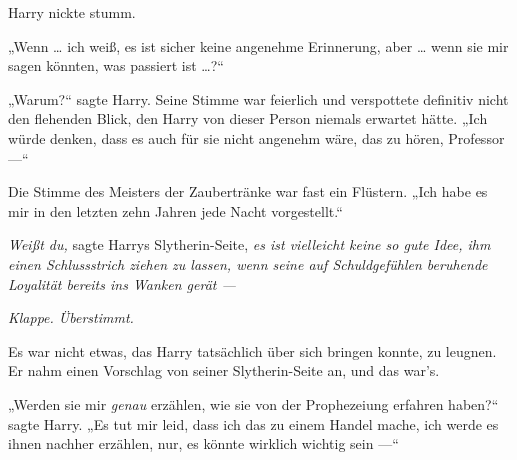 Harry nickte stumm.

„Wenn … ich weiß, es ist sicher keine angenehme Erinnerung, aber … wenn sie mir sagen könnten, was passiert ist …?“

„Warum?“ sagte Harry.
Seine Stimme war feierlich und verspottete definitiv nicht den flehenden Blick, den Harry von dieser Person niemals erwartet hätte.
„Ich würde denken, dass es auch für sie nicht angenehm wäre, das zu hören, Professor —“

Die Stimme des Meisters der Zaubertränke war fast ein Flüstern.
„Ich habe es mir in den letzten zehn Jahren jede Nacht vorgestellt.“

\emph{Weißt du,} sagte Harrys Slytherin-Seite, \emph{es ist vielleicht keine so gute Idee, ihm einen Schlussstrich ziehen zu lassen, wenn seine auf Schuldgefühlen beruhende Loyalität bereits ins Wanken gerät —}

\emph{Klappe. Überstimmt.}

Es war nicht etwas, das Harry tatsächlich über sich bringen konnte, zu leugnen. Er nahm einen Vorschlag von seiner Slytherin-Seite an, und das war’s.

„Werden sie mir \emph{genau} erzählen, wie sie von der Prophezeiung erfahren haben?“ sagte Harry.
„Es tut mir leid, dass ich das zu einem Handel mache, ich werde es ihnen nachher erzählen, nur, es könnte wirklich wichtig sein —“

